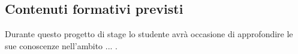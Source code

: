 \subsection{Contenuti formativi previsti}
Durante questo progetto di stage lo studente avrà occasione di approfondire le sue conoscenze nell'ambito ... .
